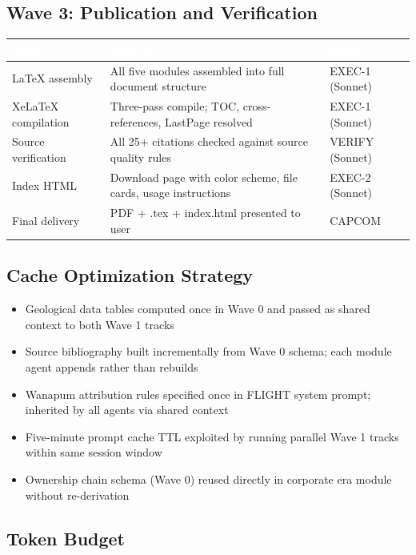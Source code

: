 \documentclass[11pt,letterpaper]{article}
\newcommand{\tableheader}[1]{\textbf{\sffamily\textcolor{white}{#1}}}
\begin{document}
\subsection{Wave 3: Publication and Verification}

\begin{center}
\begin{tabularx}{\textwidth}{L{3.5cm}XC{2cm}}
\toprule
{}
\tableheader{Task} & \tableheader{Output} & \tableheader{Agent} \\
\midrule
LaTeX assembly & All five modules assembled into full document structure & EXEC-1 (Sonnet) \\
XeLaTeX compilation & Three-pass compile; TOC, cross-references, LastPage resolved & EXEC-1 (Sonnet) \\
Source verification & All 25+ citations checked against source quality rules & VERIFY (Sonnet) \\
Index HTML & Download page with color scheme, file cards, usage instructions & EXEC-2 (Sonnet) \\
Final delivery & PDF + .tex + index.html presented to user & CAPCOM \\
\bottomrule
\end{tabularx}
\end{center}

\subsection{Cache Optimization Strategy}

\begin{itemize}[noitemsep]
  \item Geological data tables computed once in Wave 0 and passed as shared context to both Wave 1 tracks
  \item Source bibliography built incrementally from Wave 0 schema; each module agent appends rather than rebuilds
  \item Wanapum attribution rules specified once in FLIGHT system prompt; inherited by all agents via shared context
  \item Five-minute prompt cache TTL exploited by running parallel Wave 1 tracks within same session window
  \item Ownership chain schema (Wave 0) reused directly in corporate era module without re-derivation
\end{itemize}

\subsection{Token Budget}
\end{document}
